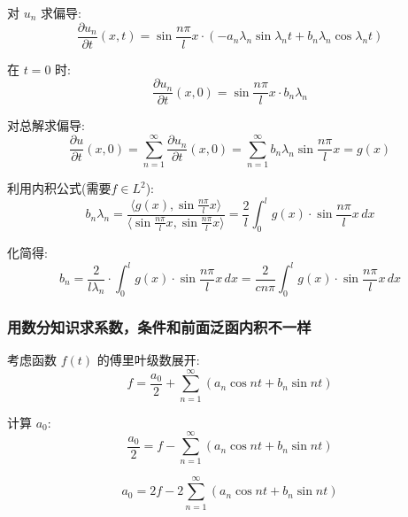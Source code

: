 \documentclass[12pt,a4paper]{article}
\numberwithin{subsection}{section}   %
\numberwithin{subsubsection}{subsection}
\theoremstyle{plain}
\theoremstyle{definition}
\theoremstyle{remark}
\theoremstyle{verification}
\begin{document}
	对 \(u_n\) 求偏导:
	\begin{equation}
		\frac{\partial u_n}{\partial t}(x, t) = \sin \frac{n\pi}{l} x \cdot \left( -a_n \lambda_n \sin \lambda_n t + b_n \lambda_n \cos \lambda_n t \right)
	\end{equation}
	
	在 \(t = 0\) 时:
	\begin{equation}
		\frac{\partial u_n}{\partial t}(x, 0) = \sin \frac{n\pi}{l} x \cdot b_n \lambda_n
	\end{equation}
	
	对总解求偏导:
	\begin{equation}
		\frac{\partial u}{\partial t}(x, 0) = \sum_{n=1}^{\infty} \frac{\partial u_n}{\partial t}(x, 0) = \sum_{n=1}^{\infty} b_n \lambda_n \sin \frac{n\pi}{l} x = g(x)
	\end{equation}
	
	利用内积公式(需要$f \in L^2$):
	\begin{equation}
		b_n \lambda_n = \frac{\langle g(x), \sin \frac{n\pi}{l} x \rangle}{\langle \sin \frac{n\pi}{l} x, \sin \frac{n\pi}{l} x \rangle} = \frac{2}{l} \int_0^l g(x) \cdot \sin \frac{n\pi}{l} x \, dx
	\end{equation}
	
	化简得:
	\begin{equation}
		b_n = \frac{2}{l \lambda_n} \cdot \int_0^l g(x) \cdot \sin \frac{n\pi}{l} x \, dx = \frac{2}{c n \pi} \int_0^l g(x) \cdot \sin \frac{n\pi}{l} x \, dx
	\end{equation}
	
	\subsubsection{用数分知识求系数，条件和前面泛函内积不一样}
	
	考虑函数 \( f(t) \) 的傅里叶级数展开:
	\begin{equation}
		f = \frac{a_0}{2} + \sum_{n=1}^{\infty} \left( a_n \cos nt + b_n \sin nt \right)
	\end{equation}
	
	计算 \( a_0 \):
	\begin{equation}
		\frac{a_0}{2} = f - \sum_{n=1}^{\infty} \left( a_n \cos nt + b_n \sin nt \right)
	\end{equation}
	
	\begin{equation}
		a_0 = 2f - 2 \sum_{n=1}^{\infty} \left( a_n \cos nt + b_n \sin nt \right)
	\end{equation}
	
\end{document}
